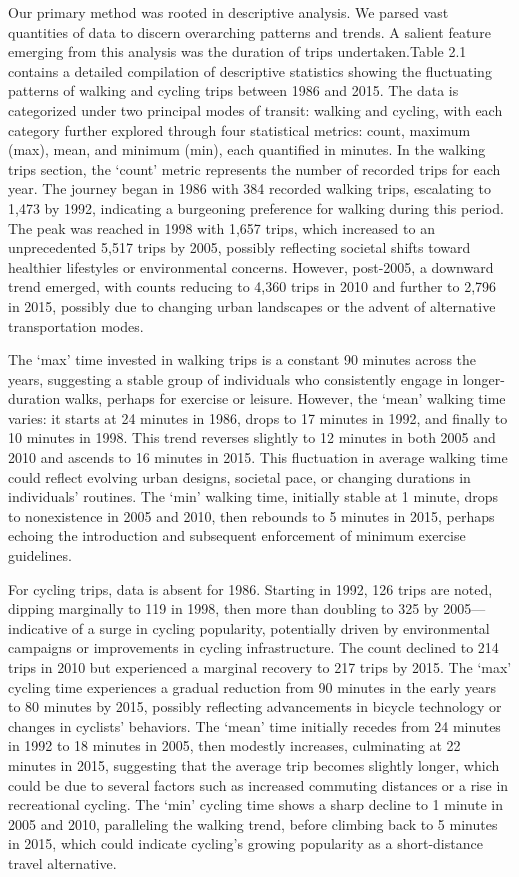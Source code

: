 \documentclass[
11pt, %
oneside, %
english, %
singlespacing, %
]{macthesis} %
\begin{document}
Our primary method was rooted in descriptive analysis. We parsed vast quantities of data to discern overarching patterns and trends. A salient feature emerging from this analysis was the duration of trips undertaken.Table 2.1 contains a detailed compilation of descriptive statistics showing the fluctuating patterns of walking and cycling trips between 1986 and 2015. The data is categorized under two principal modes of transit: walking and cycling, with each category further explored through four statistical metrics: count, maximum (max), mean, and minimum (min), each quantified in minutes. In the walking trips section, the `count' metric represents the number of recorded trips for each year. The journey began in 1986 with 384 recorded walking trips, escalating to 1,473 by 1992, indicating a burgeoning preference for walking during this period. The peak was reached in 1998 with 1,657 trips, which increased to an unprecedented 5,517 trips by 2005, possibly reflecting societal shifts toward healthier lifestyles or environmental concerns. However, post-2005, a downward trend emerged, with counts reducing to 4,360 trips in 2010 and further to 2,796 in 2015, possibly due to changing urban landscapes or the advent of alternative transportation modes.

The `max' time invested in walking trips is a constant 90 minutes across the years, suggesting a stable group of individuals who consistently engage in longer-duration walks, perhaps for exercise or leisure. However, the `mean' walking time varies: it starts at 24 minutes in 1986, drops to 17 minutes in 1992, and finally to 10 minutes in 1998. This trend reverses slightly to 12 minutes in both 2005 and 2010 and ascends to 16 minutes in 2015. This fluctuation in average walking time could reflect evolving urban designs, societal pace, or changing durations in individuals' routines. The `min' walking time, initially stable at 1 minute, drops to nonexistence in 2005 and 2010, then rebounds to 5 minutes in 2015, perhaps echoing the introduction and subsequent enforcement of minimum exercise guidelines.

For cycling trips, data is absent for 1986. Starting in 1992, 126 trips are noted, dipping marginally to 119 in 1998, then more than doubling to 325 by 2005---indicative of a surge in cycling popularity, potentially driven by environmental campaigns or improvements in cycling infrastructure. The count declined to 214 trips in 2010 but experienced a marginal recovery to 217 trips by 2015. The `max' cycling time experiences a gradual reduction from 90 minutes in the early years to 80 minutes by 2015, possibly reflecting advancements in bicycle technology or changes in cyclists' behaviors. The `mean' time initially recedes from 24 minutes in 1992 to 18 minutes in 2005, then modestly increases, culminating at 22 minutes in 2015, suggesting that the average trip becomes slightly longer, which could be due to several factors such as increased commuting distances or a rise in recreational cycling. The `min' cycling time shows a sharp decline to 1 minute in 2005 and 2010, paralleling the walking trend, before climbing back to 5 minutes in 2015, which could indicate cycling's growing popularity as a short-distance travel alternative.
\end{document}
